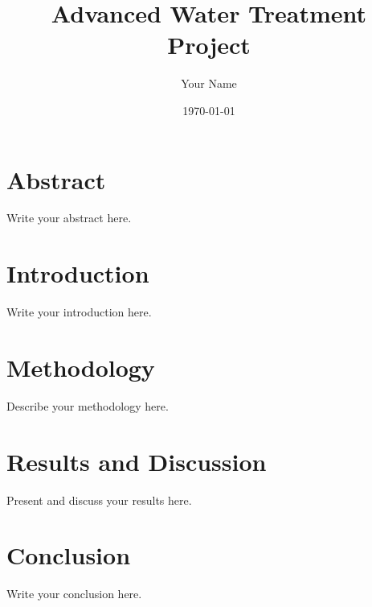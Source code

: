 \documentclass[a4paper,12pt]{article}
\title{Advanced Water Treatment Project}
\author{Your Name}
\date{\today}
\begin{document}
\maketitle

\section*{Abstract}
Write your abstract here.

\section{Introduction}
Write your introduction here.

\section{Methodology}
Describe your methodology here.

\section{Results and Discussion}
Present and discuss your results here.

\section{Conclusion}
Write your conclusion here.



\end{document}
